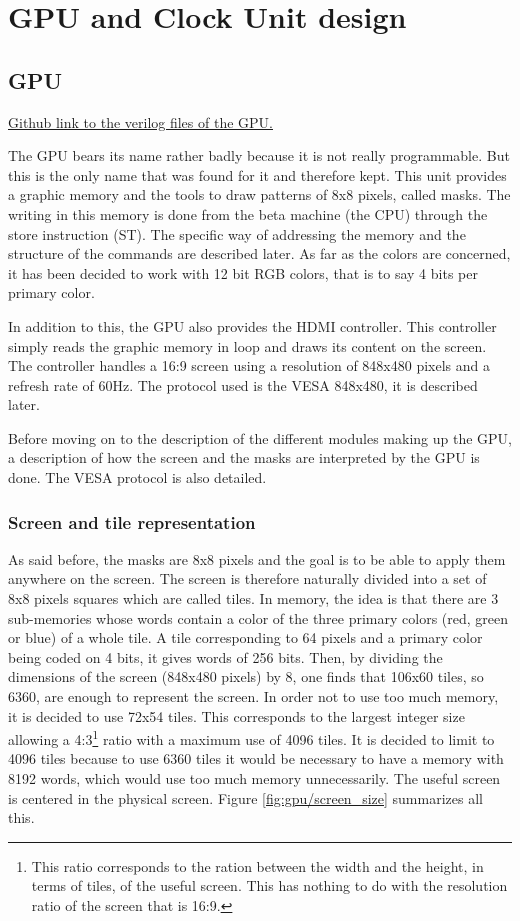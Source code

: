\chapter{GPU and Clock Unit design}

\section{GPU}

\href{https://github.com/AnotherGitAccount/TFE/tree/master/hardware/rtl/gpu}{Github link to the verilog files of the GPU.}

The GPU bears its name rather badly because it is not really programmable. But this is the only name 
that was found for it and therefore kept. This unit provides a 
graphic memory and the tools to draw patterns of 8x8 pixels, called masks. The writing in this 
memory is done from the beta machine (the CPU) through the store instruction (ST). The specific way 
of addressing the memory and the structure of the commands are described later. As far as the colors 
are concerned, it has been decided to work with 12 bit RGB colors, that is to say 4 bits per primary 
color.

In addition to this, the GPU also provides the HDMI controller. This controller simply reads the 
graphic memory in loop and draws its content on the screen. The controller handles a 
16:9 screen using a resolution of 848x480 pixels and a refresh rate of 60Hz. The protocol used is 
the VESA 848x480, it is described later. 

Before moving on to the description of the different modules making up the GPU, a description of 
how the screen and the masks are interpreted by the GPU is done. The VESA protocol is also detailed.

\subsection{Screen and tile representation}

As said before, the masks are 8x8 pixels and the goal is to be able to apply them anywhere on the 
screen. 
The screen is therefore naturally divided into a set of 8x8 pixels squares which are called tiles. 
In memory, the idea is that there are 3 sub-memories whose words contain a color of the three 
primary colors (red, green or blue) of a whole tile. A tile corresponding to 64 pixels and a 
primary color being coded on 4 bits, it gives words of 256 bits. Then, by dividing the dimensions 
of the screen (848x480 pixels) by 8, one finds that 106x60 tiles, so 6360, are enough to represent 
the screen. In order not to use too much memory, it is decided to use 72x54 tiles. This corresponds 
to the largest integer size allowing a 4:3\footnote{This ratio corresponds to the ration between the
width and the height, in terms of tiles, of the useful screen. This has nothing to do with the 
resolution ratio of the screen that is 16:9.} ratio with a maximum use of 4096 tiles.  It is decided 
to limit to 4096 tiles because to use 6360 tiles it would be necessary to have a memory with 8192 
words, which would use too much memory unnecessarily. The useful screen is centered in the physical 
screen. Figure \ref{fig:gpu/screen_size} summarizes all this.

